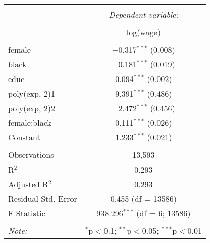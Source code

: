 
\begin{tabular}{@{\extracolsep{5pt}}lc} 
\\[-1.8ex]\hline 
\hline \\[-1.8ex] 
 & \multicolumn{1}{c}{\textit{Dependent variable:}} \\ 
\cline{2-2} 
\\[-1.8ex] & log(wage) \\ 
\hline \\[-1.8ex] 
 female & $-$0.317$^{***}$ (0.008) \\ 
  black & $-$0.181$^{***}$ (0.019) \\ 
  educ & 0.094$^{***}$ (0.002) \\ 
  poly(exp, 2)1 & 9.391$^{***}$ (0.486) \\ 
  poly(exp, 2)2 & $-$2.472$^{***}$ (0.456) \\ 
  female:black & 0.111$^{***}$ (0.026) \\ 
  Constant & 1.233$^{***}$ (0.021) \\ 
 \hline \\[-1.8ex] 
Observations & 13,593 \\ 
R$^{2}$ & 0.293 \\ 
Adjusted R$^{2}$ & 0.293 \\ 
Residual Std. Error & 0.455 (df = 13586) \\ 
F Statistic & 938.296$^{***}$ (df = 6; 13586) \\ 
\hline 
\hline \\[-1.8ex] 
\textit{Note:}  & \multicolumn{1}{r}{$^{*}$p$<$0.1; $^{**}$p$<$0.05; $^{***}$p$<$0.01} \\ 
\end{tabular} 
